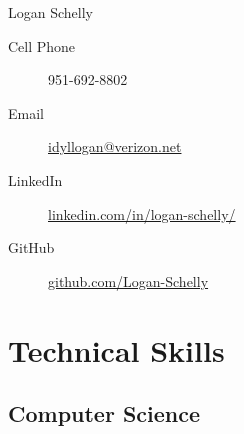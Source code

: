 \documentclass[11pt, letterpaper]{article}
\begin{document}
\begin{center}
{\Large Logan Schelly}
\end{center}

\begin{description}
  \item [Cell Phone] 951-692-8802
  \item [Email] \href{mailto:idyllogan@verizon.net}{idyllogan@verizon.net}
  \item [LinkedIn] \href{https://www.linkedin.com/in/logan-schelly/}{linkedin.com/in/logan-schelly/}
  \item [GitHub] \href{https://github.com/Logan-Schelly}{github.com/Logan-Schelly}
\end{description}

\section*{Technical Skills}
  \subsection*{Computer Science}
\end{document}
